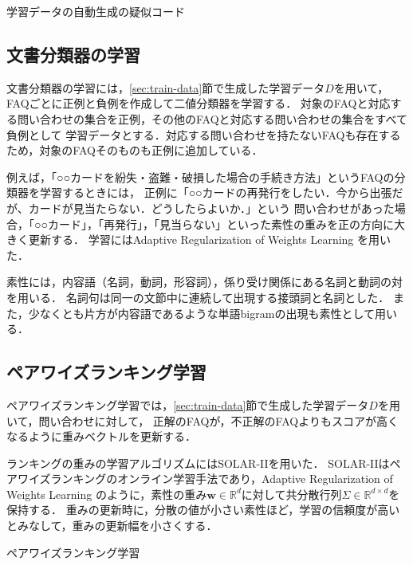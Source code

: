 \documentclass[japanese]{jnlp_1.4}
\begin{document}
\begin{algorithm}[t]
\caption{学習データの自動生成の疑似コード}
\label{alg:gendata}

\end{algorithm}


\subsection{文書分類器の学習}
\label{sec:classifier}

文書分類器の学習には，\ref{sec:train-data}節で生成した学習データ$D$を用いて，FAQごとに正例と負例を作成して二値分類器を学習する．
対象のFAQと対応する問い合わせの集合を正例，その他のFAQと対応する問い合わせの集合をすべて負例として
学習データとする．対応する問い合わせを持たないFAQも存在するため，対象のFAQそのものも正例に追加している．

例えば，「○○カードを紛失・盗難・破損した場合の手続き方法」というFAQの分類器を学習するときには，
正例に「○○カードの再発行をしたい．今から出張だが、カードが見当たらない．どうしたらよいか．」という
問い合わせがあった場合，「○○カード」，「再発行」，「見当らない」といった素性の重みを正の方向に大きく更新する．
学習にはAdaptive Regularization of Weights Learning \cite{koby:09}を用いた．

素性には，内容語（名詞，動詞，形容詞），係り受け関係にある名詞と動詞の対を用いる．
名詞句は同一の文節中に連続して出現する接頭詞と名詞とした．
また，少なくとも片方が内容語であるような単語bigramの出現も素性として用いる．


\subsection{ペアワイズランキング学習}
\label{sec:learn2rank}

ペアワイズランキング学習では，\ref{sec:train-data}節で生成した学習データ$D$を用いて，問い合わせに対して，
正解のFAQが，不正解のFAQよりもスコアが高くなるように重みベクトルを更新する．

ランキングの重みの学習アルゴリズムにはSOLAR-IIを用いた\cite{wang:15}．
SOLAR-IIはペアワイズランキングのオンライン学習手法であり，Adaptive Regularization of Weights Learning \cite{koby:09}のように，素性の重み$\mathbf{w} \in \mathbb{R}^d$に対して共分散行列$\Sigma \in \mathbb{R}^{d \times d}$を保持する．
重みの更新時に，分散の値が小さい素性ほど，学習の信頼度が高いとみなして，重みの更新幅を小さくする．

\begin{algorithm}[b]
\caption{ペアワイズランキング学習}
\label{alg:pairrank}

\end{algorithm}
\end{document}

